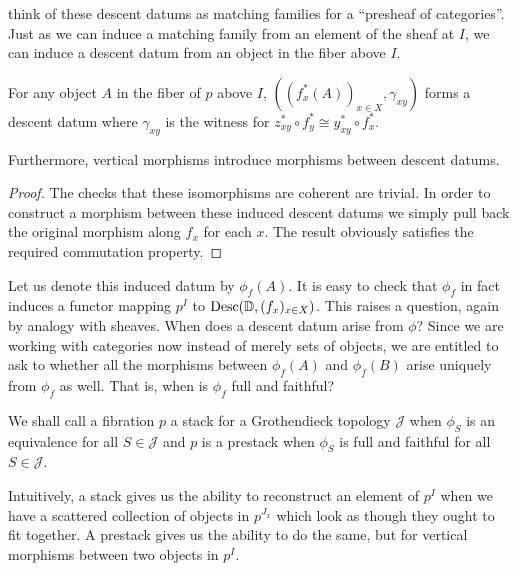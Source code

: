 think of these descent datums as matching families for a ``presheaf of
categories''. Just as we can induce a matching family from an element
of the sheaf at $I$, we can induce a descent datum from an object in
the fiber above $I$.
\begin{lem}
  For any object $A$ in the fiber of $p$ above $I$,
  $((f_x^*(A))_{x \in X}, \gamma_{xy})$ forms a descent datum where
  $\gamma_{xy}$ is the witness for
  $z_{xy}^* \circ f_y^* \cong y_{xy}^* \circ f_x^*$.

  Furthermore, vertical morphisms introduce morphisms between descent
  datums.
\end{lem}
\begin{proof}
  The checks that these isomorphisms are coherent are trivial. In
  order to construct a morphism between these induced descent datums
  we simply pull back the original morphism along $f_x$ for each
  $x$. The result obviously satisfies the required commutation
  property.
\end{proof}
Let us denote this induced datum by $\phi_f(A)$. It is easy to check
that $\phi_f$ in fact induces a functor mapping $p^I$ to
$\operatorname{Desc}(\mathbb{D}, (f_x)_{x \in X})$. This raises a question, again by
analogy with sheaves. When does a descent datum arise from $\phi$?
Since we are working with categories now instead of merely sets of
objects, we are entitled to ask to whether all the morphisms between
$\phi_f(A)$ and $\phi_f(B)$ arise uniquely from $\phi_f$ as well. That
is, when is $\phi_f$ full and faithful?
\begin{defn}
  We shall call a fibration $p$ a stack for a Grothendieck topology
  $\mathcal{J}$ when $\phi_S$ is an equivalence for all
  $S \in \mathcal{J}$ and $p$ is a prestack when $\phi_S$ is full and
  faithful for all $S \in \mathcal{J}$.
\end{defn}
Intuitively, a stack gives us the ability to reconstruct an element of
$p^I$ when we have a scattered collection of objects in $p^{J_x}$
which look as though they ought to fit together. A prestack gives us
the ability to do the same, but for vertical morphisms between two
objects in $p^I$.


